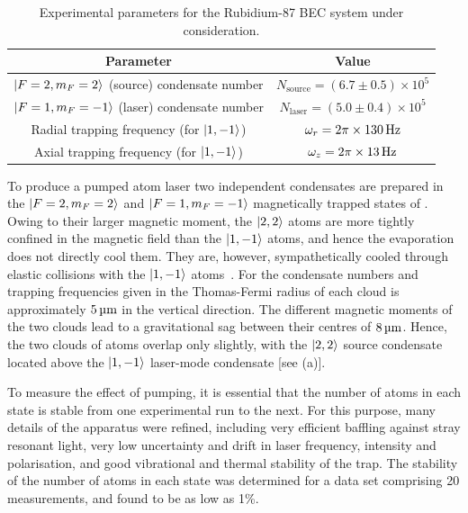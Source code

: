 \begin{table}
    \centering
    \begin{tabular}{cc}
    \toprule
    Parameter & Value\\
    \midrule
    ${\left|F=2, m_F=2\right>}$ (source) condensate number & $N_\text{source} = (6.7 \pm 0.5)\times 10^5$ \\
    ${\left|F=1, m_F=-1\right>}$ (laser) condensate number & $N_\text{laser} = (5.0 \pm 0.4) \times 10^5$ \\
    Radial trapping frequency (for ${\left|1, -1\right>}$) & $\omega_r = \unit[2\pi \times 130]{Hz}$ \\
    Axial trapping frequency (for ${\left|1, -1\right>}$) & $\omega_z = \unit[2\pi \times 13]{Hz}$ \\
    \bottomrule
    \end{tabular}
    \caption{Experimental parameters for the Rubidium-87 BEC system under consideration.}
    \label{OpticalPumping:ExperimentalParameters}
\end{table}


To produce a pumped atom laser two independent condensates are prepared in the ${\left|F=2, m_F=2\right>}$ and ${\left|F=1, m_F=-1\right>}$ magnetically trapped states of .  Owing to their larger magnetic moment, the ${\left|2, 2\right>}$ atoms are more tightly confined in the magnetic field than the ${\left|1, -1\right>}$ atoms, and hence the evaporation does not directly cool them.  They are, however, sympathetically cooled through elastic collisions with the ${\left|1, -1\right>}$ atoms~\citep{Myatt:1997}.  For the condensate numbers and trapping frequencies given in  the Thomas-Fermi radius of each cloud is approximately $\unit[5]{\micro m}$ in the vertical direction.  The different magnetic moments of the two clouds lead to a gravitational sag between their centres of $\unit[8]{\micro m}$. Hence, the two clouds of atoms overlap only slightly, with the ${\left|2, 2\right>}$ source condensate located above the ${\left|1, -1\right>}$ laser-mode condensate [see (a)].

To measure the effect of pumping, it is essential that the number of atoms in each state is stable from one experimental run to the next.  For this purpose, many details of the apparatus were refined, including very efficient baffling against stray resonant light, very low uncertainty and drift in laser frequency, intensity and polarisation, and good vibrational and thermal stability of the trap.  The stability of the number of atoms in each state was determined for a data set comprising 20 measurements, and found to be as low as 1\%.

